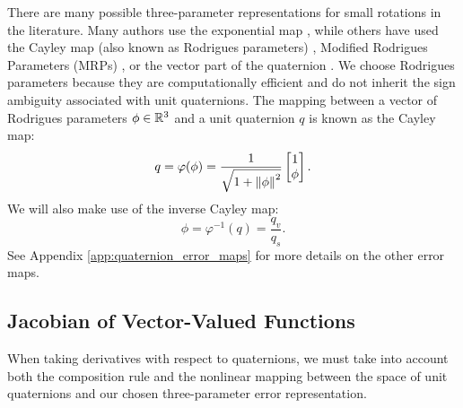 \documentclass[../root.tex]{subfiles}
\begin{document}
        There are many possible three-parameter representations for small rotations in
        the literature. Many authors use the exponential map 
        \cite{baillieul_Geometric_1978,lee_Optimal_2008,saccon_Optimal_2013,
        sola_Quaternion_2017,fan_Online_2016,watterson_Trajectory_2018},
        while others have used the Cayley map (also known as Rodrigues parameters)
        \cite{kobilarov_Discrete_2011,kobilarov_Discrete_2014},
        Modified Rodrigues Parameters (MRPs) \cite{terzakis_Modified_2018}, 
        or the vector part of the quaternion \cite{fresk_Full_2013}.
        We choose Rodrigues parameters \cite{markley_Fundamentals_2014} because they are
        computationally efficient and do not inherit the sign ambiguity associated with
        unit quaternions. The mapping between a vector of Rodrigues parameters $\phi \in
        \mathbb{R}^3$ and a unit quaternion $q$ is known as the Cayley map: \begin{equation}
        \label{eq:cayley}
            q = \varphi(\phi) = \frac{1}{\sqrt{1 + \norm{\phi}^2}} \begin{bmatrix} 1 \\ \phi \end{bmatrix}.
        \end{equation}
        We will also make use of the inverse Cayley map:
        \begin{equation}
            \phi = \varphi^{-1}(q) = \frac{q_v}{q_s}.
        \end{equation}
        See Appendix \ref{app:quaternion_error_maps} for more details on the other 
        error maps.

    \subsection{Jacobian of Vector-Valued Functions} \label{sec:quat_jacobian}
        When taking derivatives with respect to quaternions, we must take into account
        both the composition rule and the nonlinear mapping between the space of unit
        quaternions and our chosen three-parameter error representation.
\end{document}
